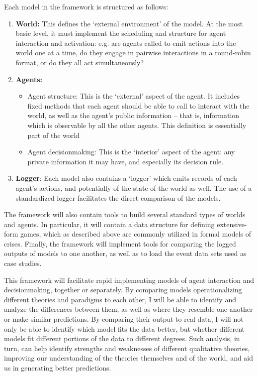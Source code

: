 Each model in the framework is structured as follows:

\begin{enumerate} \def\labelenumi{\arabic{enumi}.} \item   \textbf{World:} This defines the `external environment' of the model.   At the most basic level, it must implement the scheduling and   structure for agent interaction and activation: e.g. are agents called to emit   actions into the world one at a time, do they engage in pairwise interactions in   a round-robin format, or do they all act simultaneously? \item   \textbf{Agents:}

  \begin{itemize}   \itemsep1pt\parskip0pt   \item     Agent structure: This is the `external' aspect of the agent. It     includes fixed methods that each agent should be able to call to     interact with the world, as well as the agent's public information     -- that is, information which is observable by all the other agents.     This definition is essentially part of the world   \item     Agent decisionmaking: This is the `interior' aspect of the agent:     any private information it may have, and especially its decision     rule.   \end{itemize} \item   \textbf{Logger}: Each model also contains a `logger' which emits   records of each agent's actions, and potentially of the state of the   world as well. The use of a standardized logger facilitates the direct   comparison of the models. \end{enumerate}

The framework will also contain tools to build several standard types of worlds and agents. In particular, it will contain a data structure for defining extensive-form games, which as described above are commonly utilized in formal models of crises. Finally, the framework will implement tools for comparing the logged outputs of models to one another, as well as to load the event data sets used as case studies.

This framework will facilitate rapid implementing models of agent interaction and decisionmaking, together or separately. By comparing models operationalizing different theories and paradigms to each other, I will be able to identify and analyze the differences between them, as well as where they resemble one another or make similar predictions. By comparing their output to real data, I will not only be able to identify which model fits the data better, but whether different models fit different portions of the data to different degrees. Such analysis, in turn, can help identify strengths and weaknesses of different qualitative theories, improving our understanding of the theories themselves and of the world, and aid us in generating better predictions.

